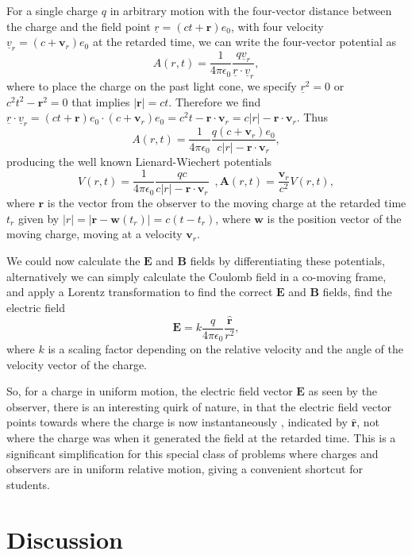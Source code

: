 \documentclass[12pt,aps,prb,preprint]{revtex4}   %
\newcommand{\be}{\begin{equation}}
\newcommand{\ee}{\end{equation}}
\begin{document}
For a single charge $ q $ in arbitrary motion with the four-vector distance between the charge and the field point $ \underline{r} = (ct + \mathbf{r} ) e_0 $, with four velocity $ \underline{v}_r = (c + \mathbf{v}_r) e_0 $ at the retarded time, we can write the four-vector potential as
\be
A(r,t) = \frac{1}{4 \pi \epsilon_0} \frac{q \underline{v}_r}{\underline{r} \cdot \underline{v}_r} ,
\ee
where to place the charge on the past light cone, we specify $ \underline{r}^2 = 0 $ or $ c^2 t^2 -\mathbf{r}^2 = 0 $ that implies $ |\mathbf{r}| = ct $.  Therefore we find $ \underline{r} \cdot \underline{v}_r = (ct + \mathbf{r} ) e_0 \cdot (c + \mathbf{v}_r) e_0 = c^2 t - \mathbf{r} \cdot \textbf{v}_r = c |r| - \mathbf{r} \cdot \mathbf{v}_r$. Thus
\be
A(r,t) = \frac{1}{4 \pi \epsilon_0} \frac{q (c + \mathbf{v}_r) e_0}{c |r| - \mathbf{r} \cdot \mathbf{v}_r} ,
\ee
producing the well known Lienard-Wiechert potentials \cite{Griffiths:1999}
\be
V(r,t) = \frac{1}{4 \pi \epsilon_0} \frac{q c}{ c |r| - \mathbf{r} \cdot \mathbf{v}_r} \,\,\, , \mathbf{A}(r,t) = \frac{\mathbf{v}_r}{c^2} V(r,t),
\ee
where $ \textbf{r} $ is the vector from the observer to the moving charge at the retarded time $ t_r $ given by $ | r | = | \mathbf{r} - \textbf{w}(t_r)| = c (t-t_r) $, where $ \textbf{w} $ is the position vector of the moving charge, moving at a velocity $ \mathbf{v}_r $.

We could now calculate the $ \mathbf{E} $ and $ \mathbf{B} $ fields by differentiating these potentials, alternatively we can simply calculate the Coulomb field in a co-moving frame, and apply a Lorentz transformation to find the correct $ \mathbf{E} $ and $ \mathbf{B} $ fields, find the electric field
\be
\mathbf{E} = k \frac{q}{4 \pi \epsilon_0 } \frac{\mathbf{\hat{r}}}{r^2} ,
\ee
where $ k $ is a scaling factor depending on the relative velocity and the angle of the velocity vector of the charge.

So, for a charge in uniform motion, the electric field vector $ \textbf{E} $ as seen by the observer, there is an interesting quirk of nature, in that the electric field vector points towards where the charge is now instantaneously \cite{Griffiths:1999}, indicated by $ \mathbf{\hat{r}} $, not where the charge was when it generated the field at the retarded time.  This is a significant simplification for this special class of problems where charges and observers are in uniform relative motion, giving a convenient shortcut for students.

\section{Discussion}
\end{document}
